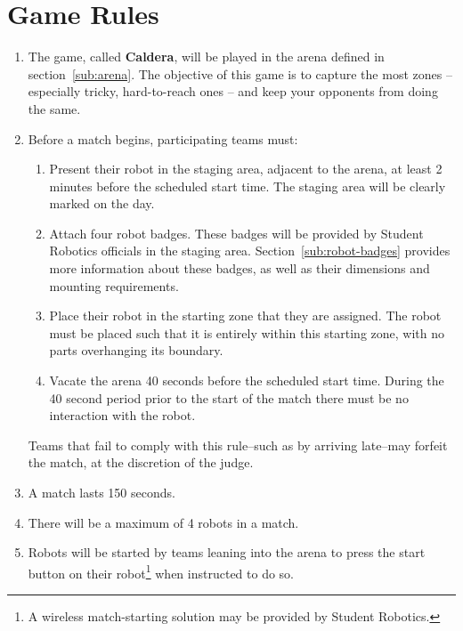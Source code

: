 \section {Game Rules}
\label{game-rules}

\begin{enumerate}
\item The game, called \textbf{Caldera}, will be played in the arena defined in section~\ref{sub:arena}.  The objective of this game is to capture the most zones -- especially tricky, hard-to-reach ones -- and keep your opponents from doing the same.

\item Before a match begins, participating teams must:
\begin {enumerate}
  \item Present their robot in the staging area, adjacent to the arena, at least 2 minutes before the scheduled start time.
        The staging area will be clearly marked on the day.

  \item Attach four robot badges.
        These badges will be provided by Student Robotics officials in the staging area.
        Section~\ref{sub:robot-badges} provides more information about these badges, as well as their dimensions and mounting requirements.

  \item Place their robot in the starting zone that they are assigned.
        The robot must be placed such that it is entirely within this starting zone, with no parts overhanging its boundary.

  \item Vacate the arena 40 seconds before the scheduled start time.
        During the 40 second period prior to the start of the match there must be no interaction with the robot.
\end{enumerate}
  Teams that fail to comply with this rule--such as by arriving late--may forfeit the match, at the discretion of the judge.

\item A match lasts 150 seconds.

\item There will be a maximum of 4 robots in a match.

\item Robots will be started by teams leaning into the arena to press the start button on their robot\footnote{A wireless match-starting solution may be provided by Student Robotics.} when instructed to do so.


\end{enumerate}
